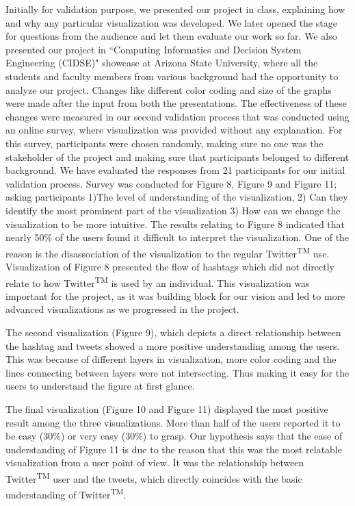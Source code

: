 \documentclass[11pt]{article}
\begin{document}
Initially for validation purpose, we presented our project in class, explaining how and why any particular visualization was developed. We later opened the stage for questions from the audience and let them evaluate our work so far. We also presented our project in ``Computing Informatics and Decision System Engineering (CIDSE)" showcase at Arizona State University, where all the students and faculty members from various background had the opportunity to analyze our project. Changes like different color coding and size of the graphs were made after the input from both the presentations. The effectiveness of these changes were measured in our second validation process that was conducted using an online survey, where visualization was provided without any explanation. For this survey, participants were chosen randomly, making sure no one was the stakeholder of the project and making sure that participants belonged to different background. We have evaluated the responses from 21 participants for our initial validation process. Survey was conducted for Figure 8, Figure 9 and Figure 11; asking participants 1)The level of understanding of the visualization, 2) Can they identify the most prominent part of the visualization 3) How can we change the visualization to be more intuitive. The results relating to Figure 8 indicated that nearly 50\% of the users found it difficult to interpret the visualization. One of the reason is the disassociation of the visualization to the regular Twitter\textsuperscript{TM} use. Visualization of Figure 8 presented the flow of hashtags which did not directly relate to how Twitter\textsuperscript{TM} is used by an individual. This visualization was important for the project, as it was building block for our vision and led to more advanced visualizations as we progressed in the project.

The second visualization (Figure 9), which depicts a direct relationship between the hashtag and tweets showed a more positive understanding among the users. This was because of different layers in visualization, more color coding and the lines connecting between layers were not intersecting. Thus making it easy for the users to understand the figure at first glance.
 
The final visualization (Figure 10 and Figure 11) displayed the most positive result among the three visualizations. More than half of the users reported it to be easy (30\%) or very easy (30\%) to grasp. Our hypothesis says that the ease of understanding of Figure 11 is due to the reason that this was the most relatable visualization from a user point of view. It was the relationship between Twitter\textsuperscript{TM} user and the tweets, which directly coincides with the basic understanding of Twitter\textsuperscript{TM}. 
\end{document}
